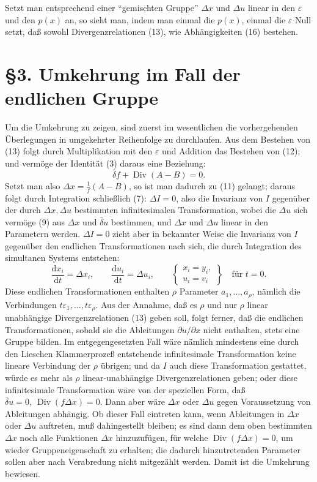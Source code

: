 \documentclass[11pt]{article}
\newcommand{\D}{\Delta}
\providecommand{\eps}{\varepsilon}
\providecommand{\dd}{\mathrm d}
\providecommand{\Div}{\operatorname{Div}}
\providecommand{\bd}{\bar{\delta}}
\providecommand{\p}{\partial}
\providecommand{\p}{\partial}
\providecommand{\dd}{\mathrm d}
\begin{document}
Setzt man entsprechend einer ``gemischten Gruppe'' \(\D x\) und \(\D u\) linear in den \(\eps\) und den \(p(x)\) an, so sieht man, indem man einmal die \(p(x)\), einmal die \(\eps\) Null setzt, daß sowohl Divergenzrelationen (13), wie Abhängigkeiten (16) bestehen.

\section*{\S{}3. Umkehrung im Fall der endlichen Gruppe}

Um die Umkehrung zu zeigen, sind zuerst im wesentlichen die vorhergehenden Überlegungen in umgekehrter Reihenfolge zu durchlaufen. Aus dem Bestehen von (13) folgt durch Multiplikation mit den \(\eps\) und Addition das Bestehen von (12); und vermöge der Identität (3) daraus eine Beziehung:
\[
\bd f+\Div(A-B)=0.
\]
Setzt man also \(\D x=\frac{1}{f}(A-B)\), so ist man dadurch zu (11) gelangt; daraus folgt durch Integration schließlich (7): \(\D I=0\), also die Invarianz von \(I\) gegenüber der durch \(\D x,\D u\) bestimmten infinitesimalen Transformation, wobei die \(\D u\) sich vermöge (9) aus \(\D x\) und \(\bd u\) bestimmen, und \(\D x\) und \(\D u\) linear in den Parametern werden. \(\D I=0\) zieht aber in bekannter Weise die Invarianz von \(I\) gegenüber den endlichen Transformationen nach sich, die durch Integration des simultanen Systems entstehen:
\begin{equation}
\frac{\dd x_i}{\dd t}=\D x_i,\qquad
\frac{\dd u_i}{\dd t}=\D u_i,\qquad
\left\{\begin{array}{l}
x_i=y_i,\\
u_i=v_i
\end{array}\right\}
\quad\text{für }t=0.
\tag{17}
\end{equation}
Diese endlichen Transformationen enthalten \(\rho\) Parameter \(a_1,\ldots,a_\rho\), nämlich die Verbindungen \(t\eps_1,\ldots,t\eps_\rho\). Aus der Annahme, daß es \(\rho\) und nur \(\rho\) linear unabhängige Divergenzrelationen (13) geben soll, folgt ferner, daß die endlichen Transformationen, sobald sie die Ableitungen \(\p u/\p x\) nicht enthalten, stets eine Gruppe bilden. Im entgegengesetzten Fall wäre nämlich mindestens eine durch den Lieschen Klammerprozeß entstehende infinitesimale Transformation keine lineare Verbindung der \(\rho\) übrigen; und da \(I\) auch diese Transformation gestattet, würde es mehr als \(\rho\) linear-unabhängige Divergenzrelationen geben; oder diese infinitesimale Transformation wäre von der speziellen Form, daß \(\bd u=0,\ \Div(f\D x)=0\). Dann aber wäre \(\D x\) oder \(\D u\) gegen Voraussetzung von Ableitungen abhängig. Ob dieser Fall eintreten kann, wenn Ableitungen in \(\D x\) oder \(\D u\) auftreten, muß dahingestellt bleiben; es sind dann dem oben bestimmten \(\D x\) noch alle Funktionen \(\D x\) hinzuzufügen, für welche \(\Div(f\D x)=0\), um wieder Gruppeneigenschaft zu erhalten; die dadurch hinzutretenden Parameter sollen aber nach Verabredung nicht mitgezählt werden. Damit ist die Umkehrung bewiesen.
\end{document}
